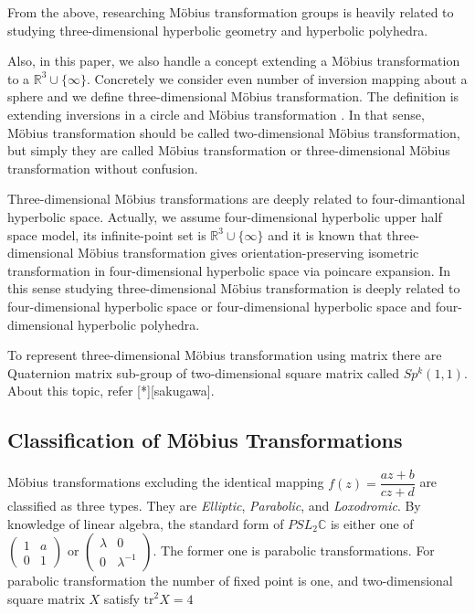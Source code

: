 From the above, researching M\"obius transformation groups is heavily
related to studying three-dimensional hyperbolic geometry and hyperbolic
polyhedra.

Also, in this paper, we also handle a concept extending a M\"obius
transformation to a $\mathbb{R}^3\cup\{\infty\}$.
Concretely we consider even number of inversion mapping about a sphere
and we define three-dimensional M\"obius transformation.
The definition is extending inversions in a circle and M\"obius
transformation .
In that sense, M\"obius transformation should be called two-dimensional
M\"obius transformation, but
simply they are called M\"obius transformation or three-dimensional M\"obius
transformation without confusion.

Three-dimensional M\"obius transformations are deeply related to
four-dimantional hyperbolic space. Actually, we assume four-dimensional
hyperbolic upper half space model, its infinite-point set is
$\mathbb{R}^3\cup\{\infty\}$ and it is known that three-dimensional M\"obius
transformation gives orientation-preserving isometric transformation in
four-dimensional hyperbolic space via poincare expansion.
In this sense studying three-dimensional M\"obius transformation is
deeply related to four-dimensional hyperbolic space or four-dimensional
hyperbolic space and four-dimensional hyperbolic polyhedra.

To represent three-dimensional M\"obius transformation using matrix
there are Quaternion matrix sub-group of two-dimensional square matrix called
$Sp^k(1,1)$. About this topic, refer [*][sakugawa].

\subsection{Classification of M\"obius Transformations}

M\"obius transformations excluding the identical mapping
$f(z) = \dfrac{az + b}{cz + d}$ are classified as three types.
They are \textit{Elliptic}, \textit{Parabolic}, and \textit{Loxodromic}.
By knowledge of linear algebra, the standard form of $PSL_2\mathbb{C}$
is either one of $\begin{pmatrix}1 & a \\ 0 & 1 \end{pmatrix}$ or
$\begin{pmatrix}\lambda & 0 \\ 0 & \lambda^{-1} \end{pmatrix}$.
The former one is parabolic transformations.
For parabolic transformation the number of fixed point is one, and
two-dimensional square matrix $X$ satisfy $\mathrm{tr}^2X = 4$

